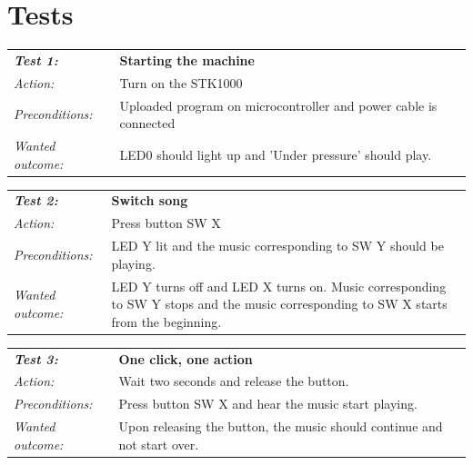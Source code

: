 \documentclass[a4paper,12pt]{article}
\begin{document}
\clearpage
\appendix
{}
\section{Tests}

\begin{tabular}[h]{|lp{12cm}|} \hline
\textbf{\emph{Test 1:}} 		& \textbf{Starting the machine}\\
\emph{Action:} 		& Turn on the STK1000\\
\emph{Preconditions:}	& Uploaded program on microcontroller and power cable is connected\\
\emph{Wanted outcome:}	& LED0 should light up and 'Under pressure' should play. \\ \hline
\end{tabular}
\vspace{1cm}

\begin{tabular}[h]{|lp{12cm}|} \hline
\textbf{\emph{Test 2:}} 		& \textbf{Switch song}\\
\emph{Action:} 		& Press button SW X\\
\emph{Preconditions:}	& LED Y lit and the music corresponding to SW Y should be playing.\\
\emph{Wanted outcome:}	& LED Y turns off and LED X turns on. Music corresponding to SW Y stops and the music corresponding to SW X starts from the beginning.\\ \hline
\end{tabular}
\vspace{1cm}

\begin{tabular}[h]{|lp{12cm}|} \hline
\textbf{\emph{Test 3:}} 		& \textbf{One click, one action}\\
\emph{Action:} 		& Wait two seconds and release the button.\\
\emph{Preconditions:}	& Press button SW X and hear the music start playing.\\
\emph{Wanted outcome:}	& Upon releasing the button, the music should continue and not start over. \\ \hline
\end{tabular}
\vspace{1cm}
\end{document}
